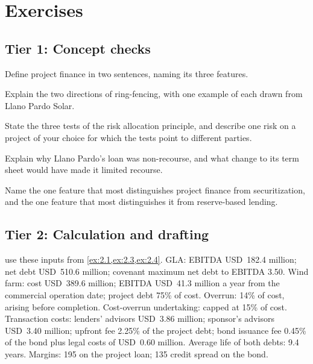 \section{Exercises}\label{sec:2.13}

\subsection*{Tier 1: Concept checks}

\begin{exercise}\label{exr:2.1}
Define project finance in two sentences, naming its three features.
\end{exercise}

\begin{exercise}\label{exr:2.2}
Explain the two directions of ring-fencing, with one example of each drawn from Llano Pardo Solar.
\end{exercise}

\begin{exercise}\label{exr:2.3}
State the three tests of the risk allocation principle, and describe one risk on a project of your choice for which the tests point to different parties.
\end{exercise}

\begin{exercise}\label{exr:2.4}
Explain why Llano Pardo's loan was non-recourse, and what change to its term sheet would have made it limited recourse.
\end{exercise}

\begin{exercise}\label{exr:2.5}
Name the one feature that most distinguishes project finance from securitization, and the one feature that most distinguishes it from reserve-based lending.
\end{exercise}

\subsection*{Tier 2: Calculation and drafting}

 use these inputs from \cref{ex:2.1,ex:2.3,ex:2.4}. GLA: EBITDA USD~182.4 million; net debt USD~510.6 million; covenant maximum net debt to EBITDA 3.50\x. Wind farm: cost USD~389.6 million; EBITDA USD~41.3 million a year from the commercial operation date; project debt 75\% of cost. Overrun: 14\% of cost, arising before completion. Cost-overrun undertaking: capped at 15\% of cost. Transaction costs: lenders' advisors USD~3.86 million; sponsor's advisors USD~3.40 million; upfront fee 2.25\% of the project debt; bond issuance fee 0.45\% of the bond plus legal costs of USD~0.60 million. Average life of both debts: 9.4 years. Margins: 195\bps{} on the project loan; 135\bps{} credit spread on the bond.

